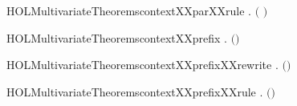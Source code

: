 \newcommand{\HOLMultivariateTheoremscontextXXparXXrewrite}{\UseVerbatim{HOLMultivariateTheoremscontextXXparXXrewrite}}
\begin{SaveVerbatim}{HOLMultivariateTheoremscontextXXparXXrule}
\HOLTokenTurnstile{} \HOLSymConst{\HOLTokenForall{}}  .
          \HOLSymConst{\HOLTokenConj{}}    \HOLSymConst{\HOLTokenImp{}}   \ensuremath{(} \HOLSymConst{\ensuremath{\mid}} \ensuremath{)}
\end{SaveVerbatim}
\newcommand{\HOLMultivariateTheoremscontextXXparXXrule}{\UseVerbatim{HOLMultivariateTheoremscontextXXparXXrule}}
\begin{SaveVerbatim}{HOLMultivariateTheoremscontextXXprefix}
\HOLTokenTurnstile{} \HOLSymConst{\HOLTokenForall{}}  .   \ensuremath{(}\HOLSymConst{\ensuremath{\ldotp}}\ensuremath{)} \HOLSymConst{\HOLTokenImp{}}   
\end{SaveVerbatim}
\newcommand{\HOLMultivariateTheoremscontextXXprefix}{\UseVerbatim{HOLMultivariateTheoremscontextXXprefix}}
\begin{SaveVerbatim}{HOLMultivariateTheoremscontextXXprefixXXrewrite}
\HOLTokenTurnstile{} \HOLSymConst{\HOLTokenForall{}}  .   \ensuremath{(}\HOLSymConst{\ensuremath{\ldotp}}\ensuremath{)} \HOLSymConst{\HOLTokenEquiv{}}   
\end{SaveVerbatim}
\newcommand{\HOLMultivariateTheoremscontextXXprefixXXrewrite}{\UseVerbatim{HOLMultivariateTheoremscontextXXprefixXXrewrite}}
\begin{SaveVerbatim}{HOLMultivariateTheoremscontextXXprefixXXrule}
\HOLTokenTurnstile{} \HOLSymConst{\HOLTokenForall{}}  .    \HOLSymConst{\HOLTokenImp{}}   \ensuremath{(}\HOLSymConst{\ensuremath{\ldotp}}\ensuremath{)}
\end{SaveVerbatim}
\newcommand{\HOLMultivariateTheoremscontextXXprefixXXrule}{\UseVerbatim{HOLMultivariateTheoremscontextXXprefixXXrule}}
